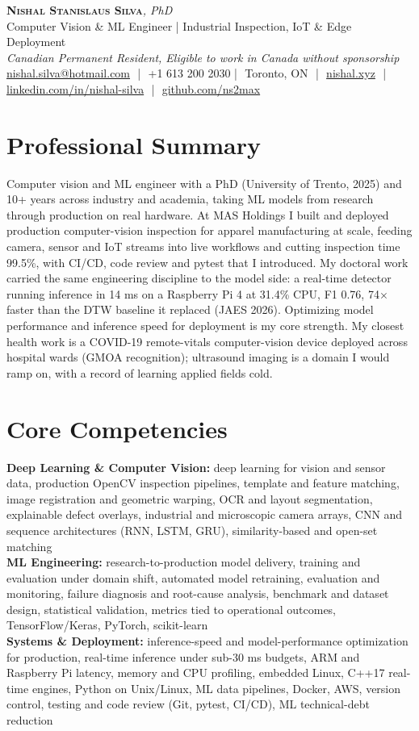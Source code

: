 \documentclass[11pt]{article}
\makeatletter
\newcommand{\cvName}{Nishal Stanislaus Silva}
\newcommand{\cvEmail}{nishal.silva@hotmail.com}
\newcommand{\cvPhone}{+1 613 200 2030}
\newcommand{\cvCity}{Toronto, ON}
\newcommand{\cvSite}{https://nishal.xyz}
\newcommand{\cvLinkedIn}{https://www.linkedin.com/in/nishal-silva}
\newcommand{\cvGitHub}{https://github.com/ns2max}
\newcommand{\cvStatus}{Canadian Permanent Resident, Eligible to work in Canada without sponsorship}
\newcommand{\cvTagline}{Computer Vision \& ML Engineer | Industrial Inspection, IoT \& Edge Deployment}
\makeatother
\begin{document}
\pagestyle{empty}
\begin{center}
    {\LARGE \scshape \textbf{\cvName}}{\large \textit{, PhD}}\\[1pt]
    {\small \cvTagline}\\[1pt]
    {\footnotesize\textit{\cvStatus}}\\[1pt]
    {\small
    \href{mailto:\cvEmail}{\cvEmail} \,\,|\,\, \cvPhone \,\,|\,\, \cvCity
    \,\,|\,\, \href{\cvSite}{nishal.xyz} \,\,|\,\, \href{\cvLinkedIn}{linkedin.com/in/nishal-silva}
    \,\,|\,\, \href{\cvGitHub}{github.com/ns2max}}
\end{center}

\section*{Professional Summary}

Computer vision and ML engineer with a PhD (University of Trento, 2025) and 10+ years across industry and academia, taking ML models from research through production on real hardware. At MAS Holdings I built and deployed production computer-vision inspection for apparel manufacturing at scale, feeding camera, sensor and IoT streams into live workflows and cutting inspection time 99.5\%, with CI/CD, code review and pytest that I introduced. My doctoral work carried the same engineering discipline to the model side: a real-time detector running inference in 14 ms on a Raspberry Pi 4 at 31.4\% CPU, F1 0.76, 74$\times$ faster than the DTW baseline it replaced (JAES 2026). Optimizing model performance and inference speed for deployment is my core strength. My closest health work is a COVID-19 remote-vitals computer-vision device deployed across hospital wards (GMOA recognition); ultrasound imaging is a domain I would ramp on, with a record of learning applied fields cold.

\section*{Core Competencies}

\textbf{Deep Learning \& Computer Vision:} deep learning for vision and sensor data, production OpenCV inspection pipelines, template and feature matching, image registration and geometric warping, OCR and layout segmentation, explainable defect overlays, industrial and microscopic camera arrays, CNN and sequence architectures (RNN, LSTM, GRU), similarity-based and open-set matching\\
\textbf{ML Engineering:} research-to-production model delivery, training and evaluation under domain shift, automated model retraining, evaluation and monitoring, failure diagnosis and root-cause analysis, benchmark and dataset design, statistical validation, metrics tied to operational outcomes, TensorFlow/Keras, PyTorch, scikit-learn\\
\textbf{Systems \& Deployment:} inference-speed and model-performance optimization for production, real-time inference under sub-30 ms budgets, ARM and Raspberry Pi latency, memory and CPU profiling, embedded Linux, C++17 real-time engines, Python on Unix/Linux, ML data pipelines, Docker, AWS, version control, testing and code review (Git, pytest, CI/CD), ML technical-debt reduction
\end{document}
